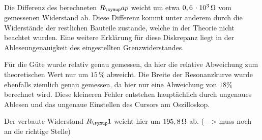 Die Differenz des berechneten $R_\su{ap}$ weicht um etwa $0,6\,\cdot10^3 \,\si{\ohm}$
vom gemessenen Widerstand ab. Diese Differenz kommt unter anderem durch die Widerstände
der restlichen Bauteile zustande, welche in der Theorie nicht beachtet wurden.
Eine weitere Erklärung für diese Diskrepanz liegt in der Ableseungenauigkeit
des eingestellten Grenzwiderstandes.

Für die Güte wurde relativ genau gemessen, da hier die relative Abweichung zum
theoretischen Wert nur um $15\,\si{\percent}$ abweicht.
Die Breite der Resonanzkurve wurde ebenfalls ziemlich genau gemessen, da hier
nur eine Abweichung von $18\si{\percent}$ berechnet wird.
Diese kleineren Fehler entstehen hauptächlich durch ungenaues Ablesen und das
ungenaue Einstellen des Cursors am Oszilloskop.


Der verbaute Widerstand $R_\su{1}$ weicht hier um $195,8\,\si{\ohm}$ ab.
(---> muss noch an die richtige Stelle)
